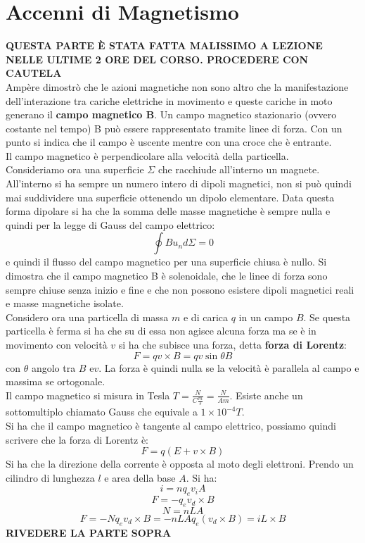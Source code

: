 \documentclass[a4paper,12pt, oneside]{book}
\begin{document}
\section{Accenni di Magnetismo}
\textbf{QUESTA PARTE È STATA FATTA MALISSIMO A LEZIONE NELLE ULTIME 2 ORE DEL CORSO. PROCEDERE CON CAUTELA}\\
Ampère dimostrò che le azioni magnetiche non sono altro che la manifestazione dell'interazione tra cariche elettriche in movimento e queste cariche in moto generano il \textbf{campo magnetico B}. Un campo magnetico stazionario (ovvero costante nel tempo) B può essere rappresentato tramite linee di forza. Con un punto si indica che il campo è uscente mentre con una croce che è entrante. \\
Il campo magnetico è perpendicolare alla velocità della particella.\\
Consideriamo ora una superficie $\Sigma$ che racchiude all'interno un magnete. All'interno si ha sempre un numero intero di dipoli magnetici, non si può quindi mai suddividere una superficie ottenendo un dipolo elementare. Data questa forma dipolare si ha che la somma delle masse magnetiche è sempre nulla e quindi per la legge di Gauss del campo elettrico:
$$\oint Bu_nd\Sigma=0$$
e quindi il flusso del campo magnetico per una superficie chiusa è nullo. Si dimostra che il campo magnetico B è solenoidale, che le linee di forza sono sempre chiuse senza inizio e fine e che non possono esistere dipoli magnetici reali e masse magnetiche isolate.
\\Considero ora una particella di massa $m$ e di carica $q$ in un campo $B$. Se questa particella è ferma si ha che su di essa non agisce alcuna forza ma se è in movimento con velocità $v$ si ha che subisce una forza, detta \textbf{forza di Lorentz}:
$$F=qv\times B=qv\sin\theta B$$
con $\theta$ angolo tra $B$ e$v$. La forza è quindi nulla se la velocità è parallela al campo e massima se ortogonale. \\
Il campo magnetico si misura in Tesla $T=\frac{N}{C\frac{m}{s}}=\frac{N}{Am}$. Esiste anche un sottomultiplo chiamato Gauss che equivale a $1\times 10^{-4}T$.\\
Si ha che il campo magnetico è tangente al campo elettrico, possiamo quindi scrivere che la forza di Lorentz è:
$$F=q(E+v\times B)$$
Si ha che la direzione della corrente è opposta al moto degli elettroni. Prendo un cilindro di lunghezza $l$ e area della base $A$. Si ha:
$$i=nq_ev_iA$$
$$F=-q_ev_d\times B$$
$$N=nLA$$
$$F=-Nq_ev_d\times B=-nLAq_e(v_d\times B)=iL\times B$$
\textbf{RIVEDERE LA PARTE SOPRA}
\end{document}
